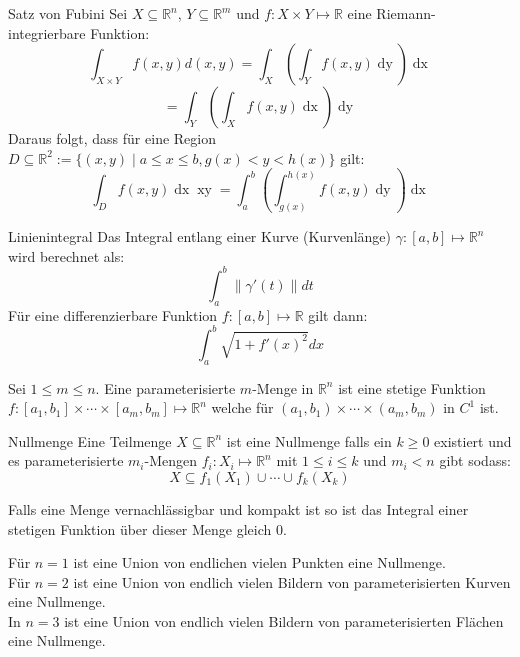 \documentclass[a4paper,10pt]{article}
\def\R{\mathbb{R}}
\def\dx{\mathop{dx}}
\def\dy{\mathop{dy}}
\begin{document}
\begin{mainbox}{Satz von Fubini}
  Sei $X \subseteq \R^n$, $Y \subseteq \R^m$ und $f: X \times Y \mapsto \R$ eine Riemann-integrierbare Funktion:
  $$\int_{X \times Y} f(x, y) d(x, y) = \int_X \left( \int_Y f(x,y) \dy \right) \dx$$
  $$= \int_Y \left( \int_X f(x,y) \dx \right) \dy$$
  Daraus folgt, dass für eine Region \(D \subseteq \R^2 := \{\left(x,y\right) \mid a \le x \le b, g(x) < y < h(x)\}\) gilt:
  \[\int_D f(x,y)\mathop{dx} \mathop{xy} = \int_a^b \left(\int_{g(x)}^{h(x)} f(x,y) \mathop{dy}\right)\mathop{dx}\]
\end{mainbox}

\begin{subbox}{Linienintegral}
  Das Integral entlang einer Kurve (Kurvenlänge) $\gamma: [a, b] \mapsto \R^n$ wird berechnet als:
  $$\int_a^b \lVert \gamma'(t) \rVert dt$$
  Für eine differenzierbare Funktion $f: [a, b] \mapsto \R$ gilt dann:
  $$\int_a^b \sqrt{1 + f'(x)^2} dx$$
\end{subbox}

Sei $1 \leq m \leq n$. Eine parameterisierte $m$-Menge in $\R^n$ ist eine stetige Funktion $f: [a_1, b_1] \times \cdots \times [a_m, b_m] \mapsto \R^n$ welche für $(a_1, b_1) \times \cdots \times (a_m, b_m)$ in $C^1$ ist. 

\begin{mainbox}{Nullmenge}
  Eine Teilmenge $X \subseteq \R^n$ ist eine Nullmenge falls ein $k \geq 0$ existiert und es parameterisierte $m_i$-Mengen $f_i: X_i \mapsto \R^n$ mit $1 \leq i \leq k$ und $m_i < n$ gibt sodass:
  $$X \subseteq f_1(X_1) \cup \cdots \cup f_k(X_k)$$

  Falls eine Menge vernachlässigbar und kompakt ist so ist das Integral einer stetigen Funktion über dieser Menge gleich $0$.
\end{mainbox}

Für $n=1$ ist eine Union von endlichen vielen Punkten eine Nullmenge.\\
Für $n=2$ ist eine Union von endlich vielen Bildern von parameterisierten Kurven eine Nullmenge.\\
In $n=3$ ist eine Union von endlich vielen Bildern von parameterisierten Flächen eine Nullmenge.
\end{document}
